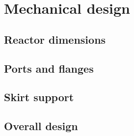 \section{Mechanical design}
\subsection{Reactor dimensions}
\subsection{Ports and flanges}
\subsection{Skirt support}
\subsection{Overall design}

